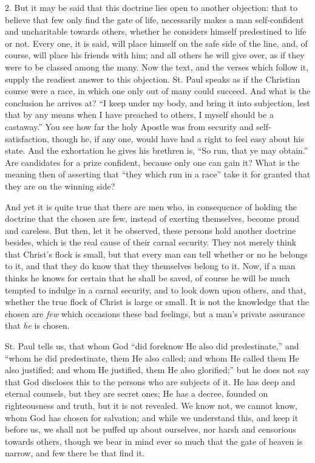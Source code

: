 2. But it may be said that this doctrine lies open to another
objection: that to believe that few only find the gate of life,
necessarily makes a man self-confident and uncharitable towards
others, whether he considers himself predestined to life or not. Every
one, it is said, will place himself on the safe side of the line, and,
of course, will place his friends with him; and all others he will
give over, as if they were to be classed among the many. Now the text,
and the verses which follow it, supply the readiest answer to this
objection. St. Paul speaks as if the Christian course were a race, in
which one only out of many could succeed. And what is the conclusion
he arrives at? ``I keep under my body, and bring it into
subjection, lest that by any means when I have preached to others, I
myself should be a castaway.'' You see how far the holy Apostle
was from security and self-satisfaction, though he, if any one, would
have had a right to feel easy about his state. And the exhortation he
gives his brethren is, ``So run, that ye may obtain.'' Are
candidates for a prize confident, because only one can gain it? What
is the meaning then of asserting that ``they which run in a
race'' take it for granted that they are on the winning side?

And yet it is quite true that there are men who, in consequence of
holding the doctrine that the chosen are few, instead of exerting
themselves, become proud and careless. But then, let it be observed,
these persons hold another doctrine besides, which is the real cause
of their carnal security. They not merely think that Christ's flock is
small, but that every man can tell whether or no he belongs to it, and
that they do know that they themselves belong to it. Now, if a man
thinks he knows for certain that he shall be saved, of course he will
be much tempted to indulge in a carnal security, and to look down upon
others, and that, whether the true flock of Christ is large or small.
It is not the knowledge that the chosen are \emph{few} which occasions
these bad feelings, but a man's private assurance that \emph{he} is
chosen.

St. Paul tells us, that whom God ``did foreknow He also did
predestinate,'' and ``whom he did predestinate, them He also
called; and whom He called them He also justified; and whom He
justified, them He also glorified;'' but he does not say that God
discloses this to the persons who are subjects of it. He has deep and
eternal counsels, but they are secret ones; He has a decree, founded
on righteousness and truth, but it is not revealed. We know not, we
cannot know, whom God has chosen for salvation; and while we
understand this, and keep it before us, we shall not be puffed up
about ourselves, nor harsh and censorious towards others, though we
bear in mind ever so much that the gate of heaven is narrow, and few
there be that find it.

